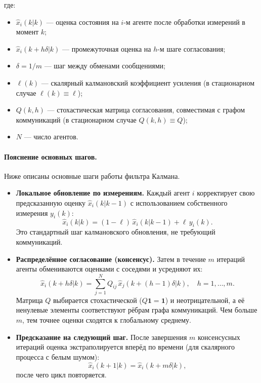 \begin{enumerate}
где:
\begin{itemize}
    \item $\hat{x}_i(k|k)$ — оценка состояния на $i$-м агенте после обработки измерений в момент $k$;
    \item $\hat{x}_i(k + h\delta|k)$ — промежуточная оценка на $h$-м шаге согласования;
    \item $\delta = 1/m$ — шаг между обменами сообщениями;
    \item $\ell(k)$ — скалярный калмановский коэффициент усиления (в стационарном случае $\ell(k) \equiv \ell$);
    \item $Q(k,h)$ — стохастическая матрица согласования, совместимая с графом коммуникаций (в стационарном случае $Q(k,h) \equiv Q$);
    \item $N$ — число агентов.
\end{itemize}

\paragraph{Пояснение основных шагов.}

Ниже описаны основные шаги работы фильтра Калмана. 

\begin{itemize}

\item \textbf{Локальное обновление по измерениям.}  
Каждый агент $i$ корректирует свою предсказанную оценку $\hat{x}_i(k|k-1)$ с использованием собственного измерения $y_i(k)$:
\[
\hat{x}_i(k|k) = (1-\ell)\,\hat{x}_i(k|k-1) + \ell\,y_i(k).
\]
Это стандартный шаг калмановского обновления, не требующий коммуникаций.

\item \textbf{Распределённое согласование (консенсус).}  
Затем в течение $m$ итераций агенты обмениваются оценками с соседями и усредняют их:
\[
\hat{x}_i(k + h\delta|k) = \sum_{j=1}^{N} Q_{ij}\,\hat{x}_j(k + (h-1)\delta|k), \quad h = 1,\dots,m.
\]
Матрица $Q$ выбирается стохастической ($Q\mathbf{1}=\mathbf{1}$) и неотрицательной, а её ненулевые элементы соответствуют рёбрам графа коммуникаций. Чем больше $m$, тем точнее оценки сходятся к глобальному среднему.

\item \textbf{Предсказание на следующий шаг.}  
После завершения $m$ консенсусных итераций оценка экстраполируется вперёд по времени (для скалярного процесса с белым шумом):
\[
\hat{x}_i(k+1|k) = \hat{x}_i(k + m\delta|k),
\]
после чего цикл повторяется.

\end{itemize}
\end{enumerate}